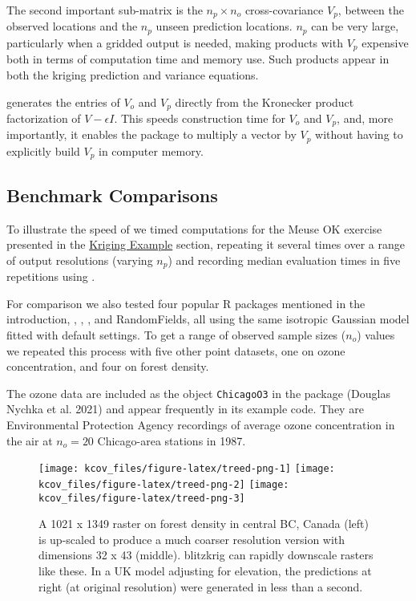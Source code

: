 The second important sub-matrix is the \(n_p \times n_o\) cross-covariance \(V_p\), between the observed locations and the \(n_p\) unseen prediction locations. \(n_p\) can be very large, particularly when a gridded output is needed, making products with \(V_p\) expensive both in terms of computation time and memory use. Such products appear in both the kriging prediction and variance equations.

 generates the entries of \(V_o\) and \(V_p\) directly from the Kronecker product factorization of \(V - \epsilon I\). This speeds construction time for \(V_o\) and \(V_p\), and, more importantly, it enables the package to multiply a vector by \(V_p\) without having to explicitly build \(V_p\) in computer memory.

\hypertarget{benchmark-comparisons}{%
\subsection{Benchmark Comparisons}\label{benchmark-comparisons}}

To illustrate the speed of  we timed computations for the Meuse OK exercise presented in the \protect\hyperlink{kriging-example}{Kriging Example} section, repeating it several times over a range of output resolutions (varying \(n_p\)) and recording median evaluation times in five repetitions using .

For comparison we also tested four popular R packages mentioned in the introduction, , , , and RandomFields, all using the same isotropic Gaussian model fitted with default settings. To get a range of observed sample sizes (\(n_o\)) values we repeated this process with five other point datasets, one on ozone concentration, and four on forest density.

The ozone data are included as the object \texttt{ChicagoO3} in the  package (Douglas Nychka et al. 2021) and appear frequently in its example code. They are Environmental Protection Agency recordings of average ozone concentration in the air at \(n_o=20\) Chicago-area stations in 1987.

\begin{figure}[htb]
\texttt{[image: kcov\_files/figure-latex/treed-png-1]} \texttt{[image: kcov\_files/figure-latex/treed-png-2]} \texttt{[image: kcov\_files/figure-latex/treed-png-3]} \caption{A 1021 x 1349 raster on forest density in central BC, Canada (left) is up-scaled to produce a much coarser resolution version with dimensions 32 x 43 (middle). blitzkrig can rapidly downscale rasters like these. In a UK model adjusting for elevation, the predictions at right (at original resolution) were generated in less than a second.}\label{fig:treed-png}
\end{figure}

